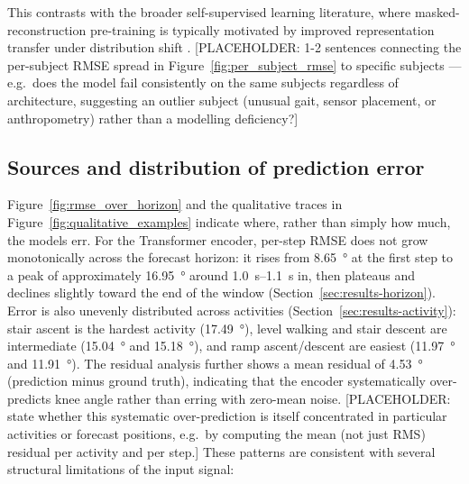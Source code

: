 This contrasts with the broader self-supervised learning literature, where
masked-reconstruction pre-training is typically motivated by improved
representation transfer under distribution shift \cite{PLACEHOLDER}. %
[PLACEHOLDER: 1-2 sentences connecting the per-subject RMSE spread in
Figure~\ref{fig:per_subject_rmse} to specific subjects — e.g.\ does the model
fail consistently on the same subjects regardless of architecture, suggesting an
outlier subject (unusual gait, sensor placement, or anthropometry) rather than a
modelling deficiency?]

\subsection{Sources and distribution of prediction error}\label{sec:disc-error}

Figure~\ref{fig:rmse_over_horizon} and the qualitative traces in
Figure~\ref{fig:qualitative_examples} indicate where, rather than simply how
much, the models err. For the Transformer encoder, per-step RMSE does not grow
monotonically across the forecast horizon: it rises from \SI{8.65}{\degree} at
the first step to a peak of approximately \SI{16.95}{\degree} around
\SI{1.0}{\second}--\SI{1.1}{\second} in, then plateaus and declines slightly
toward the end of the window (Section~\ref{sec:results-horizon}). Error is also
unevenly distributed across activities (Section~\ref{sec:results-activity}):
stair ascent is the hardest activity (\SI{17.49}{\degree}), level walking and
stair descent are intermediate (\SI{15.04}{\degree} and \SI{15.18}{\degree}),
and ramp ascent/descent are easiest (\SI{11.97}{\degree} and
\SI{11.91}{\degree}). The residual analysis further shows a mean residual of
\SI{4.53}{\degree} (prediction minus ground truth), indicating that the
encoder systematically over-predicts knee angle rather than erring with
zero-mean noise. [PLACEHOLDER: state whether this systematic over-prediction
is itself concentrated in particular activities or forecast positions, e.g.\
by computing the mean (not just RMS) residual per activity and per step.]
These patterns are consistent with several structural limitations of the
input signal:

